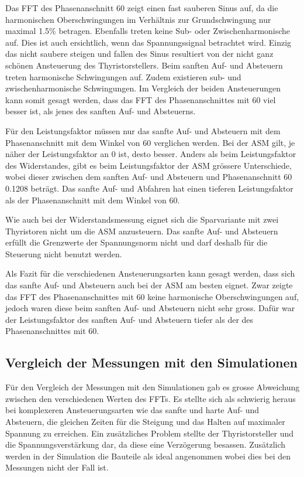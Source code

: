 Das FFT des Phasenanschnitt 60\textdegree \hspace{0.02cm} zeigt einen fast sauberen Sinus auf, da die harmonischen Oberschwingungen im Verhältnis zur Grundschwingung nur maximal 1.5\% betragen. Ebenfalls treten keine Sub- oder Zwischenharmonische auf. Dies ist auch ersichtlich, wenn das Spannungssignal betrachtet wird. Einzig das nicht saubere steigen und fallen des Sinus resultiert von der nicht ganz schönen Ansteuerung des Thyristorstellers. Beim sanften Auf- und Absteuern treten harmonische Schwingungen auf. Zudem existieren sub- und zwischenharmonische Schwingungen. Im Vergleich der beiden Ansteuerungen kann somit gesagt werden, dass das FFT des Phasenanschnittes mit 60\textdegree \hspace{0.02cm} viel besser ist, als jenes des sanften Auf- und Absteuerns.

Für den Leistungsfaktor müssen nur das sanfte Auf- und Absteuern mit dem Phasenanschnitt mit dem Winkel von 60\textdegree \hspace{0.02cm} verglichen werden. Bei der ASM gilt, je näher der Leistungsfaktor an 0 ist, desto besser. Anders als beim Leistungsfaktor des Widerstandes, gibt es beim Leistungsfaktor der ASM grössere Unterschiede, wobei dieser zwischen dem sanften Auf- und Absteuern und Phasenanschnitt 60\textdegree \hspace{0.02cm} 0.1208 beträgt. Das sanfte Auf- und Abfahren hat einen tieferen Leistungsfaktor als der Phasenanschnitt mit dem Winkel von 60\textdegree. 

Wie auch bei der Widerstandsmessung eignet sich die Sparvariante mit zwei Thyristoren nicht um die ASM anzusteuern. Das sanfte Auf- und Absteuern erfüllt die Grenzwerte der Spannungsnorm nicht und darf deshalb für die Steuerung nicht benutzt werden.

Als Fazit für die verschiedenen Ansteuerungsarten kann gesagt werden, dass sich das sanfte Auf- und Absteuern auch bei der ASM am besten eignet. Zwar zeigte das FFT des Phasenanschnittes mit 60\textdegree \hspace{0.02cm} keine harmonische Oberschwingungen auf, jedoch waren diese beim sanften Auf- und Absteuern nicht sehr gross. Dafür war der Leistungsfaktor des sanften Auf- und Absteuern tiefer als der des Phasenanschnittes mit 60\textdegree.

\subsection{Vergleich der Messungen mit den Simulationen}
Für den Vergleich der Messungen mit den Simulationen gab es grosse Abweichung zwischen den verschiedenen Werten des FFTs. Es stellte sich als schwierig heraus bei komplexeren Ansteuerungsarten wie das sanfte und harte Auf- und Absteuern, die gleichen Zeiten für die Steigung und das Halten auf maximaler Spannung zu erreichen. Ein zusätzliches Problem stellte der Thyristorsteller und die Spannungsverstärkung dar, da diese eine Verzögerung besassen. Zusätzlich werden in der Simulation die Bauteile als ideal angenommen wobei dies bei den Messungen nicht der Fall ist.







